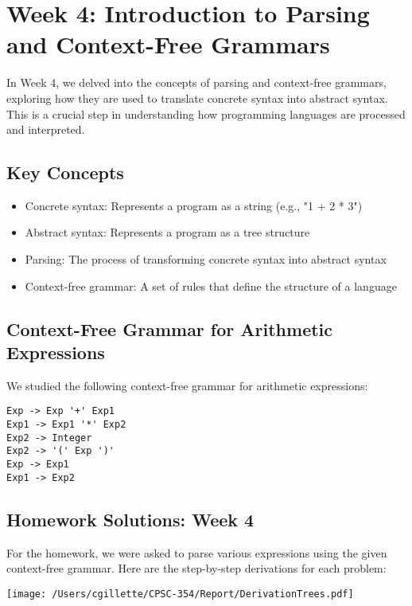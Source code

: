 \documentclass{article}
\begin{document}
\section{Week 4: Introduction to Parsing and Context-Free Grammars}
\label{sec:week4}

In Week 4, we delved into the concepts of parsing and context-free grammars, exploring how they are used to translate concrete syntax into abstract syntax. This is a crucial step in understanding how programming languages are processed and interpreted.

\subsection*{Key Concepts}

\begin{itemize}
    \item Concrete syntax: Represents a program as a string (e.g., "1 + 2 * 3")
    \item Abstract syntax: Represents a program as a tree structure
    \item Parsing: The process of transforming concrete syntax into abstract syntax
    \item Context-free grammar: A set of rules that define the structure of a language
\end{itemize}

\subsection*{Context-Free Grammar for Arithmetic Expressions}

We studied the following context-free grammar for arithmetic expressions:

\begin{verbatim}
Exp -> Exp '+' Exp1 
Exp1 -> Exp1 '*' Exp2              
Exp2 -> Integer            
Exp2 -> '(' Exp ')'  
Exp -> Exp1             
Exp1 -> Exp2
\end{verbatim}

\subsection*{Homework Solutions: Week 4}

For the homework, we were asked to parse various expressions using the given context-free grammar. Here are the step-by-step derivations for each problem:

\texttt{[image: /Users/cgillette/CPSC-354/Report/DerivationTrees.pdf]}
\end{document}
